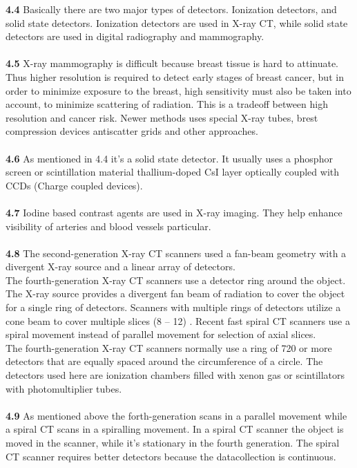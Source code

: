 \documentclass[]{article}
\begin{document}
\textbf{4.4} Basically there are two major types of detectors. Ionization detectors, and solid state detectors. Ionization detectors are used in X-ray CT, while solid state detectors are used in digital radiography and mammography.\\\\
\textbf{4.5} X-ray mammography is difficult because breast tissue is hard to attinuate. Thus higher resolution is required to detect early stages of breast cancer, but in order to minimize exposure to the breast, high sensitivity must also be taken into account, to minimize scattering of radiation. This is a tradeoff between high resolution and cancer risk. Newer methods uses special X-ray tubes, brest compression devices antiscatter grids and other approaches.\\\\
\textbf{4.6} As mentioned in 4.4 it's a solid state detector. It usually uses a phosphor screen or scintillation material thallium-doped CsI layer optically coupled with CCDs (Charge coupled devices).\\\\
\textbf{4.7} Iodine based contrast agents are used in X-ray imaging. They help enhance visibility of arteries and blood vessels particular.\\\\
\textbf{4.8} The second-generation X-ray CT scanners used a fan-beam geometry with a divergent X-ray source and a linear array of detectors.\\
The fourth-generation X-ray CT scanners use a detector ring around
the object. The X-ray source provides a divergent fan beam of radiation to cover the object for a single ring of detectors. Scanners with multiple
rings of detectors utilize a cone beam to cover multiple slices (8 – 12) . Recent fast spiral CT scanners use a spiral movement instead of parallel movement for selection of axial slices.\\
The fourth-generation X-ray CT scanners normally use a ring of 720 or more detectors that are equally spaced around the circumference of a circle. The detectors used here are ionization chambers filled with xenon gas or scintillators with photomultiplier tubes.\\\\
\textbf{4.9} As mentioned above the forth-generation scans in a parallel movement while a spiral CT scans in a spiralling movement. In a spiral CT scanner the object is moved in the scanner, while it's stationary in the fourth generation. The spiral CT scanner requires better detectors because the datacollection is continuous.\\\\
\end{document}
